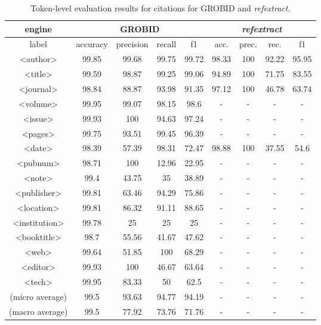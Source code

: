\begin{table}[h]
\begin{center}
\begin{tabular}{|c|cccc|cccc|}
\hline
engine &  \multicolumn{4}{c|}{GROBID} & \multicolumn{4}{c|}{\emph{refextract}}\\
\hline
label & accuracy & precision & recall & f1 & acc. & prec. & rec. & f1\\
\hline
<author>    & 99.85 &   99.68   &   99.75   &   99.72   & 98.33 &   100 &   92.22   &   95.95   \\
<title> &   99.59   &   98.87   &   99.25   &   99.06   & 94.89 &   100 &   71.75   &   83.55   \\
<journal>   & 98.84 &   88.87   &   93.98   &   91.35   & 97.12 &   100 &   46.78   &   63.74   \\
<volume>&   99.95   &   99.07   &   98.15   &   98.6    & -     &   -   &   -       &   -   \\
<issue> &   99.93   &   100     &   94.63   &   97.24   & -     &   -   &   -       &   -   \\
<pages> &   99.75   &   93.51   &   99.45   &   96.39   & -     &   -   &   -       &   -   \\
<date>  &   98.39   &   57.39   &   98.31   &   72.47   & 98.88 &   100 &   37.55   &   54.6    \\
<pubnum>&   98.71   &   100     &   12.96   &   22.95   & -     &   -   &   -       &   -   \\
<note>  &   99.4    &   43.75   &   35      &   38.89   & -     &   -   &   -       &   -   \\
<publisher>&99.81   &   63.46   &   94.29   &   75.86   & -     &   -   &   -       &   -   \\
<location>& 99.81   &   86.32   &   91.11   &   88.65   & -     &   -   &   -       &   -   \\
<institution>& 99.78&   25      &   25      &   25      & -     &   -   &   -       &   -   \\
<booktitle>&    98.7&   55.56   &   41.67   &   47.62   & -     &   -   &   -       &   -   \\
<web>   &   99.64   &   51.85   &   100     &   68.29   & -     &   -   &   -       &   -   \\
<editor>    &  99.93&   100     &46.67      &   63.64   & -     &   -   &   -       &   -   \\
<tech>  &   99.95   &   83.33   &   50      &   62.5    & -     &   -   &   -       &   -   \\
\hline
(micro average) & 99.5  &   93.63   &   94.77   &   94.19 & -    &   - &   -   &   -   \\
(macro average) & 99.5  &   77.92   &   73.76   &   71.76 & -    &   -  &   -   &   -   \\
\hline
\end{tabular}
\caption[Token-level evaluation results for citations for GROBID and \emph{refextract}.]{Token-level evaluation results for citations for GROBID and \emph{refextract}.}
\label{table:citationcomparison}
\end{center}
\end{table}

